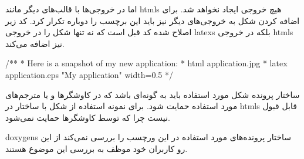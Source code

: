 اما در خروجی‌ها با قالب‌های دیگر مانند \glspl{html} هیچ خروجی ایجاد نخواهد شد.
برای اضافه کردن شکل به خروجی‌های دیگر نیز باید این برچسب را دوباره تکرار کرد. کد
زیر اصلاح شده کد قبل است که نه تنها شکل را در خروجی \glspl{latex} بلکه در خروجی
\glspl{html}‌ نیز اضافه می‌کند.

\begin{Java}
/**
 * Here is a snapshot of my new application:
 *  \image html application.jpg
 *  \image latex application.eps "My application" width=0.5\textwidth
 */
\end{Java}


\begin{warning}
ساختار پرونده شکل مورد استفاده باید به گونه‌ای باشد که در کاوشگرها و یا
مترجم‌های مورد استفاده حمایت شود. برای نمونه استفاده از شکل با ساختار 
در \glspl{html} قابل قبول نیست چرا که توسط کاوشگرها حمایت نمی‌شود.

\glspl{doxygen} ساختار پرونده‌های مورد استفاده در این ورچسب را بررسی نمی‌کند از
این رو کاربران خود موظف به بررسی این موضوع هستند.
\end{warning}






